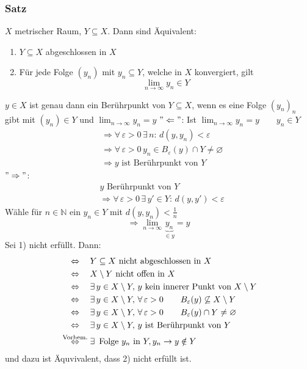 \subsubsection{Satz} %
\label{sub:Satz}
$X$ metrischer Raum, $Y \subseteq X$. Dann sind Äquivalent:
\begin{enumerate}
	\item $Y \subseteq X$ abgeschlossen in $X$
	\item Für jede Folge $(y_n)$ mit $y_n \subseteq Y$, welche in $X$ konvergiert, gilt
	\[
		\lim_{n \to \infty}y_n \in Y
	\]
	\end{enumerate}
 $y \in X$ ist genau dann ein Berührpunkt von $Y \subseteq X$, wenn es eine Folge $(y_n)_n$ gibt mit $(y_n) \in Y$ und $\lim_{n \to \infty}y_n = y$
$"\Leftarrow"$: Ist $\lim_{n \to \infty}y_n=y \qquad y_n \in Y$
\begin{align*}
	& \Rightarrow \forall\, \varepsilon>0 \,\exists\,n: \, d(y,y_n)<\varepsilon \\
	&\Rightarrow \forall\, \varepsilon>0 \, y_n \in B_{\varepsilon}(y) \cap Y \neq \varnothing \\
	&\Rightarrow y \text{ ist Berührpunkt von } Y
\end{align*}
$"\Rightarrow"$:
\begin{align*}
	&y \text{ Berührpunkt von } Y \\
	&\Rightarrow  \forall\, \varepsilon > 0 \, \exists\, y' \in Y: \, d(y,y')<\varepsilon
\end{align*}
Wähle für $n \in \mathbb{N}$ ein $y_n \in Y$ mit $d(y,y_n)<\frac{1}{n}$
\[
	\Rightarrow \lim_{n \to \infty}\underset{\in y}{\underbrace{y_n}}=y
\] \bewende
{}
Sei 1) nicht erfüllt. Dann:
\begin{align*}
	& \stackrel{\hphantom{\text{Vorbem.}}}{\Leftrightarrow}  Y \subseteq X \text{ nicht abgeschlossen in } X \\
	& \stackrel{\hphantom{\text{Vorbem.}}}{\Leftrightarrow} X \setminus Y \text{ nicht offen in } X \\
	& \stackrel{\hphantom{\text{Vorbem.}}}{\Leftrightarrow} \exists\,y \in X \setminus Y, \, y \text{ kein innerer Punkt von } X \setminus Y \\
	& \stackrel{\hphantom{\text{Vorbem.}}}{\Leftrightarrow} \exists\,y \in X \setminus Y, \, \forall\, \varepsilon>0 \qquad B_{\varepsilon}(y) \not\subseteq X
	 \setminus Y
	 \\
	& \stackrel{\hphantom{\text{Vorbem.}}}{\Leftrightarrow} \exists\,y \in X \setminus Y, \, \forall\, \varepsilon>0 \qquad B_{\varepsilon}(y) \cap Y \neq \varnothing
	 \\
	& \stackrel{\hphantom{\text{Vorbem.}}}{\Leftrightarrow} \exists\,y \in X \setminus Y, \, y \text{ ist Berührpunkt von } Y \\
	& \stackrel{\text{Vorbem.}}{\Leftrightarrow} \exists\, \text{ Folge } y_n \text{ in } Y, y_n \to y \notin  Y
\end{align*}
und dazu ist Äquvivalent, dass 2) nicht erfüllt ist.
\bewende
